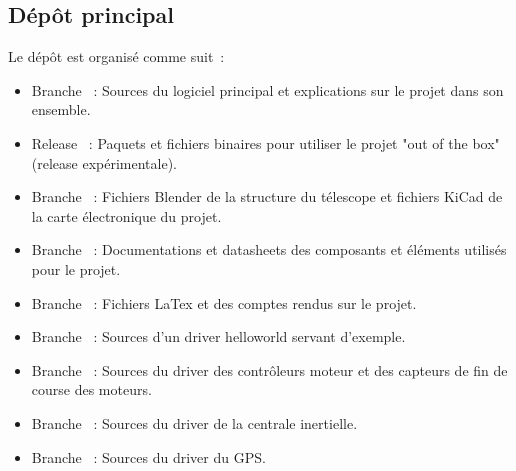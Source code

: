 \subsection{Dépôt principal}

{\href{https://github.com/thibaudledo/Autoscope}{}}

\vspace{1cm}

Le dépôt est organisé comme suit~:
\begin{itemize}[label=$\bullet$]
	\item Branche {\href{https://github.com/thibaudledo/Autoscope/tree/master}{}}~: Sources du logiciel principal et explications sur le projet dans son ensemble.
	\item Release {\href{https://github.com/thibaudledo/Autoscope/releases}{}}~: Paquets et fichiers binaires pour utiliser le projet "out of the box" (release expérimentale).
	\item Branche {\href{https://github.com/thibaudledo/Autoscope/tree/hardware}{}}~: Fichiers Blender de la structure du télescope et fichiers KiCad de la carte électronique du projet.
	\item Branche {\href{https://github.com/thibaudledo/Autoscope/tree/doc}{}}~: Documentations et datasheets des composants et éléments utilisés pour le projet.
	\item Branche {\href{https://github.com/thibaudledo/Autoscope/tree/latex}{}}~: Fichiers LaTex et  des comptes rendus sur le projet.
	\item Branche {\href{https://github.com/thibaudledo/Autoscope/tree/hello_mod}{}}~: Sources d'un driver helloworld servant d'exemple.
	\item Branche {\href{https://github.com/thibaudledo/Autoscope/tree/a4988_mod}{}}~: Sources du driver des contrôleurs moteur et des capteurs de fin de course des moteurs.
	\item Branche {\href{https://github.com/thibaudledo/Autoscope/tree/mpu9250_mod}{}}~: Sources du driver de la centrale inertielle.
	\item Branche {\href{https://github.com/thibaudledo/Autoscope/tree/mtk3339d}{}}~: Sources du driver du GPS.
	\end{itemize}

